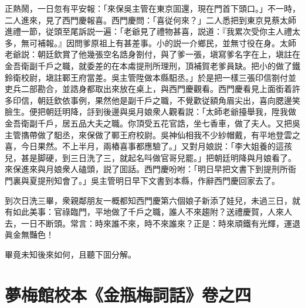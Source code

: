正熱鬧，一日忽有平安報：「來保吳主管在東京囬還，現在門首下頭口。」不一時，二人進來，見了西門慶報喜。西門慶問：「喜従何來？」二人悉把到東京見蔡太師進禮一節，従頭至尾訴説一遍：「老爺見了禮物甚喜，説道：『我累次受你主人禮太多，無可補報。』因問爹原祖上有甚差事。小的説一介鄉民，並無寸役在身。太師老爺説：朝廷欽賞了他幾張空名誥身劄付，與了爹一張，塡寫爹名字在上，塡註在金吾衛副千戶之職，就委差的在本䖏提刑所理刑，頂補賀老爹員缺。把小的做了鐵鈴衛校尉，塡註鄆王府當差。吳主管陞做本縣馹丞。」於是把一樣三張印信劄付並吏兵二部勘合，並誥身都取出來放在桌上，與西門慶觀看。西門慶看見上面銜着許多印信，朝廷欽依事例，果然他是副千戶之職，不覺歡従額角眉尖出，喜向腮邊笑臉生。便把朝廷明降，㧱到後邊與吳月娘衆人觀看説：「太師老爺擡舉我，陞我做金吾衛副千戶，居五品大夫之職。你頂受五花官誥，坐七香車，做了夫人。又把吳主管㩦帶做了馹丞，來保做了鄆王府校尉。吳神仙相我不少紗帽戴，有平地登雲之喜，今日果然。不上半月，兩樁喜事都應驗了。」又對月娘説：「李大姐養的這孩兒，甚是脚硬，到三日洗了三，就起名呌做官哥兒罷。」把朝廷明降與月娘看了。來保進來與月娘衆人磕頭，説了囬話。西門慶吩咐：「明日早把文書下到提刑所衙門裏與夏提刑知會了。」吳主管明日早下文書到本縣，作辭西門慶回家去了。

到次日洗三畢，衆親鄰朋友一概都知西門慶第六個娘子新添了娃兒，未過三日，就有如此美事：官祿臨門，平地做了千戶之職，誰人不來趨附？送禮慶賀，人來人去，一日不断頭。常言：時來誰不來，時不來誰來？正是：時來頑鐵有光輝，運退眞金無豔色！

畢竟未知後來如何，且聽下囬分解。

\part*{夢梅館校本《金瓶梅詞話》卷之四}

